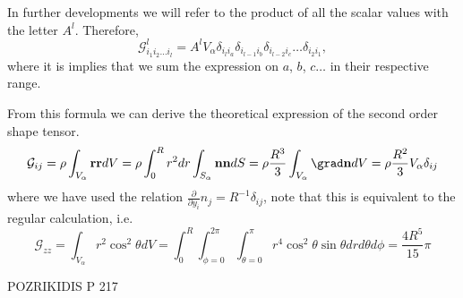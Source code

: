 In further developments we will refer to the product of all the scalar values with the letter $A^l$. 
Therefore, 
\begin{equation}
    \mathcal{G}_{i_1i_2\ldots i_l}^l 
    = A^l V_\alpha
    \delta_{i_l i_a}
    \delta_{i_{l-1} i_b}
    \delta_{i_{l-2} i_c}
    \ldots
    \delta_{i_2i_1},
    \label{eq:shapeT}
\end{equation}
where it is implies that we sum the expression on $a$, $b$, $c\ldots$ in their respective range. 

From this formula we can derive the theoretical expression of the second order shape tensor. 
\begin{equation*}
    \mathcal{G}_{ij} 
    = \rho \int_{V_\alpha} \textbf{r} \textbf{r} dV 
    = \rho \int_0^R r^2 dr \int_{S_\alpha} \textbf{n} \textbf{n}  dS 
    = \rho \frac{R^3}{3} \int_{V_\alpha} \grad \textbf{n} dV
    = \rho \frac{R^2}{3} V_\alpha \delta_{ij}
\end{equation*}
where we have used the relation $\frac{\partial}{\partial y_i}n_j = R^{-1} \delta_{ij}$, note that this is equivalent to the regular calculation, i.e. 
\begin{equation*}
    \mathcal{G}_{zz} 
    = \int_{V_\alpha} r^2 \cos^2{\theta} dV 
    = \int_{0}^R \int_{\phi = 0}^{2\pi} \int_{\theta = 0}^{\pi} r^4 \cos^2{\theta} \sin{\theta} drd\theta d\phi
    = \frac{4R^5}{15}\pi
\end{equation*}

POZRIKIDIS P 217 

